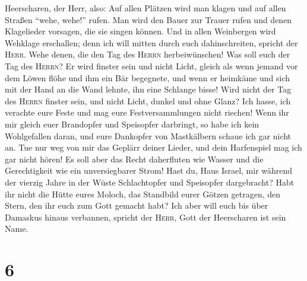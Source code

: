 Heerscharen, der Herr, also: Auf allen Plätzen wird man klagen und auf
allen Straßen ``wehe, wehe!'' rufen. Man wird den Bauer zur Trauer rufen
und denen Klagelieder vorsagen, die sie singen können. 
Und in allen Weinbergen wird Wehklage erschallen; denn ich will mitten
durch euch dahinschreiten, spricht der \textsc{Herr}. 
Wehe denen, die den Tag des \textsc{Herrn} herbeiwünschen! Was soll euch
der Tag des \textsc{Herrn}? Er wird finster sein und nicht Licht,
 gleich als wenn jemand vor dem Löwen flöhe und ihm ein
Bär begegnete, und wenn er heimkäme und sich mit der Hand an die Wand
lehnte, ihn eine Schlange bisse!  Wird nicht der Tag des
\textsc{Herrn} finster sein, und nicht Licht, dunkel und ohne Glanz?
 Ich hasse, ich verachte eure Feste und mag eure
Festversammlungen nicht riechen!  Wenn ihr mir gleich
euer Brandopfer und Speisopfer darbringt, so habe ich kein Wohlgefallen
daran, und eure Dankopfer von Mastkälbern schaue ich gar nicht an.
 Tue nur weg von mir das Geplärr deiner Lieder, und dein
Harfenspiel mag ich gar nicht hören!  Es soll aber das
Recht daherfluten wie Wasser und die Gerechtigkeit wie ein
unversiegbarer Strom!  Hast du, Haus Israel, mir während
der vierzig Jahre in der Wüste Schlachtopfer und Speisopfer dargebracht?
 Habt ihr nicht die Hütte eures Moloch, das Standbild
eurer Götzen getragen, den Stern, den ihr euch zum Gott gemacht habt?
 Ich aber will euch bis über Damaskus hinaus verbannen,
spricht der \textsc{Herr}, Gott der Heerscharen ist sein Name.

\hypertarget{section-5}{%
\section{6}\label{section-5}}

